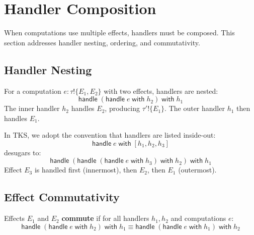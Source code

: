 \section{Handler Composition}
\label{sec:handler-composition}

When computations use multiple effects, handlers must be composed. This section addresses handler nesting, ordering, and commutativity.

\subsection{Handler Nesting}
\label{subsec:handler-nesting}

\begin{definition}
\label{def:nested-handlers}
For a computation $e : \tau \mathbin{!} \{E_1, E_2\}$ with two effects, handlers are nested:
\[
\mathsf{handle}\; (\mathsf{handle}\; e\; \mathsf{with}\; h_2)\; \mathsf{with}\; h_1
\]
The inner handler $h_2$ handles $E_2$, producing $\tau' \mathbin{!} \{E_1\}$. The outer handler $h_1$ then handles $E_1$.
\end{definition}

\begin{definition}
\label{def:handler-ordering}
In TKS, we adopt the convention that handlers are listed inside-out:
\[
\mathsf{handle}\; e\; \mathsf{with}\; [h_1, h_2, h_3]
\]
desugars to:
\[
\mathsf{handle}\; (\mathsf{handle}\; (\mathsf{handle}\; e\; \mathsf{with}\; h_3)\; \mathsf{with}\; h_2)\; \mathsf{with}\; h_1
\]
Effect $E_3$ is handled first (innermost), then $E_2$, then $E_1$ (outermost).
\end{definition}

\subsection{Effect Commutativity}
\label{subsec:effect-commutativity}

\begin{definition}
\label{def:commutative-effects}
Effects $E_1$ and $E_2$ \textbf{commute} if for all handlers $h_1, h_2$ and computations $e$:
\[
\mathsf{handle}\; (\mathsf{handle}\; e\; \mathsf{with}\; h_2)\; \mathsf{with}\; h_1 \equiv \mathsf{handle}\; (\mathsf{handle}\; e\; \mathsf{with}\; h_1)\; \mathsf{with}\; h_2
\]
\end{definition}

